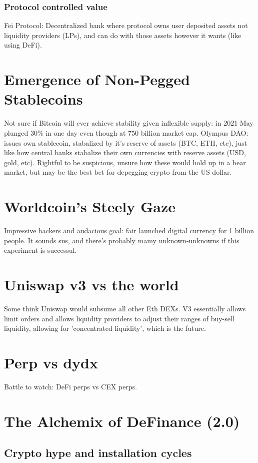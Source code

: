 \documentclass{../notes}
\begin{document}
\subsubsection{Protocol controlled value}
Fei Protocol: Decentralized bank where protocol owns user deposited assets not liquidity providers (LPs), and can do with those assets however it wants (like using DeFi). 

\section{Emergence of Non-Pegged Stablecoins}
Not sure if Bitcoin will ever achieve stability given inflexible supply: in 2021 May plunged 30\% in one day even though at 750 billion market cap. Olympus DAO: issues own stablecoin, stabalized by it's reserve of assets (BTC, ETH, etc), just like how central banks stabalize their own currencies with reserve assets (USD, gold, etc). Rightful to be suspicious, unsure how these would hold up in a bear market, but may be the best bet for depegging crypto from the US dollar. 

\section{Worldcoin's Steely Gaze}
Impressive backers and audacious goal: fair launched digital currency for 1 billion people. It sounds sus, and there's probably mamy unknown-unknowns if this experiment is successul. 

\section{Uniswap v3 vs the world}
Some think Uniswap would subsume all other Eth DEXs. V3 essentially allows limit orders and allows liquidity providers to adjust their ranges of buy-sell liquidity, allowing for 'concentrated liquidity', which is the future. 

\section{Perp vs dydx}
Battle to watch: DeFi perps vs CEX perps. 

\section{The Alchemix of DeFinance (2.0)}
\subsection{Crypto hype and installation cycles}
\end{document}

